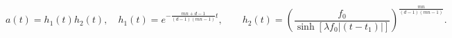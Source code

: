 \begin{equation}
a(t) = h_1(t) h_2(t), \quad
h_1(t) = e^{ - \frac{mn+d-1}{(d-1)(mn-1)} t }, \qquad
h_2(t) = \left( \frac{f_0}{\sinh[\lambda f_0 |(t-t_1)|]}
\right)^{\frac{mn}{(d-1)(mn-1)}}.
\end{equation}

